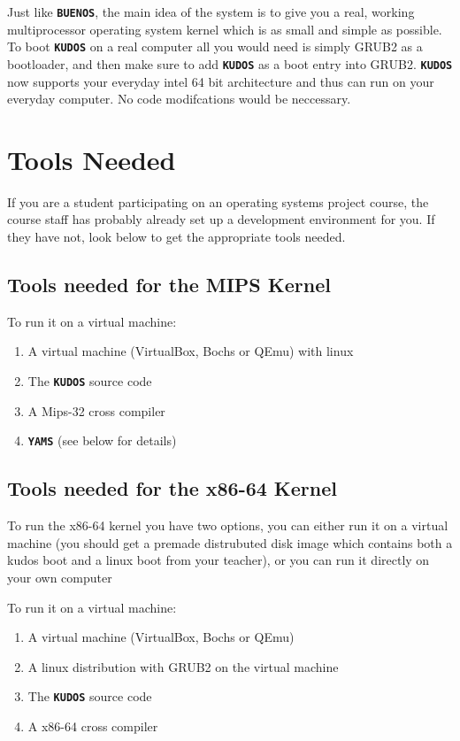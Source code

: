 \documentclass[twoside,a4paper]{report}
\newcommand{\buenos}{\texttt{\textbf{BUENOS}}}
\newcommand{\kudos}{\texttt{\textbf{KUDOS}}}
\newcommand{\yams}{\texttt{\textbf{YAMS}}}
\begin{document}
Just like \buenos{}, the main idea of the system is to give you a real, working
multiprocessor operating system kernel which is as small and simple as
possible. To boot \kudos{} on a real computer all you would need is simply
GRUB2 as a bootloader, and then make sure to add \kudos{} as a boot
entry into GRUB2. \kudos{} now supports your everyday intel 64 bit
architecture and thus can run on your everyday computer. No code
modifcations would be neccessary. 

\section {Tools Needed}
If you are a student participating on an operating systems project
course, the course staff has probably already set up a development
environment for you. If they have not, look below to get the appropriate
tools needed.

\subsection{Tools needed for the MIPS Kernel}

To run it on a virtual machine:

\begin{enumerate}
\item A virtual machine (VirtualBox, Bochs or QEmu) with linux
\item The \kudos{} source code
\item A Mips-32 cross compiler
\item \yams{} (see below for details)
\end{enumerate}

\subsection{Tools needed for the x86-64 Kernel}
To run the x86-64 kernel you have two options, you can either run
it on a virtual machine (you should get a premade distrubuted disk image
which contains both a kudos boot and a linux boot from your teacher),
or you can run it directly on your own computer

To run it on a virtual machine:

\begin{enumerate}
\item A virtual machine (VirtualBox, Bochs or QEmu)
\item A linux distribution with GRUB2 on the virtual machine
\item The \kudos{} source code
\item A x86-64 cross compiler
\end{enumerate}
\end{document}
